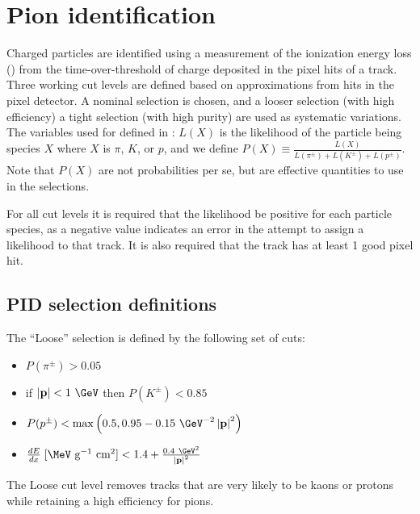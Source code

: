 \section{Pion identification}
\label{sec:pid}

Charged particles are identified using a measurement of the ionization energy loss (\dEdx) from the time-over-threshold of charge deposited in the pixel hits of a track.
Three working \pid cut levels are defined based on \dEdx approximations from hits in the pixel detector.
A nominal selection is chosen, and a looser selection (with high efficiency) a tight selection (with high purity) are used as systematic variations.
The variables used for \pid defined in : $L(X)$ is the likelihood of the particle being species $X$ where $X$ is $\pi$, $K$, or $p$, and we define $P(X) \equiv \frac{L(X)}{L(\pi^{\pm}) + L(K^{\pm}) +L(p^{\pm})}$.
Note that $P(X)$ are not probabilities per se, but are effective quantities to use in the selections.

For all cut levels it is required that the likelihood be positive for each particle species, as a negative value indicates an error in the attempt to assign a likelihood to that track.
It is also required that the track has at least 1 good pixel \dEdx hit.

\subsection{PID selection definitions}

The ``Loose'' selection is defined by the following set of cuts:
\begin{itemize}
  \item
    $P(\pi^{\pm}) > 0.05$
  \item
    if $\left|\mathbf{p}\right| < 1~\GeV$ then $P(K^{\pm}) < 0.85$
  \item
    $P(p^{\pm}) < \max\left(0.5, 0.95 - 0.15~\GeV^{-2}\left|\mathbf{p}\right|^{2} \right)$
  \item
    $\frac{dE}{dx} \; [\MeV \textrm{ g}^{-1} \textrm{ cm}^{2}] < 1.4 + \frac{0.4~\GeV^2}{\left|\mathbf{p}\right|^{2}}$
\end{itemize}
The Loose cut level removes tracks that are very likely to be kaons or protons while retaining a high efficiency for pions.

